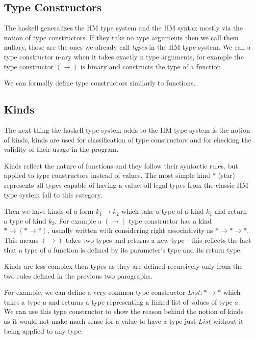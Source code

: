 \subsection{Type Constructors}

The haskell generalizes the HM type system and the HM syntax mostly via the notion of type constructors. If they take no type arguments then we call them nullary, those are the ones we already call \emph{types} in the HM type system. We call a type constructor n-ary when it takes exactly n type arguments, for example the type constructor $(\rightarrow)$ is binary and constructs the type of a function. %

We can formally define type constructors similarly to functions.

\subsection{Kinds}

The next thing the haskell type system adds to the HM type system is the notion of kinds, kinds are used for classification of type constructors and for checking the validity of their usage in the program.

Kinds reflect the nature of functions and they follow their syntactic rules, but applied to type constructors instead of values. The most simple kind $*$ (star) represents all types capable of having a value: all legal types from the classic HM type system fall to this category.

Then we have kinds of a form $k_1 \rightarrow k_2$ which take a type of a kind $k_1$ and return a type of kind $k_2$. For example a $(\rightarrow)$ type constructor has a kind $* \rightarrow (* \rightarrow *)$, usually written with considering right associativity as $* \rightarrow * \rightarrow *$. This means $(\rightarrow)$ takes two types and returns a new type - this reflects the fact that a type of a function is defined by its parameter's type and its return type.

Kinds are less complex then types as they are defined recursively only from the two rules defined in the previous two paragraphs.

For example, we can define a very common type constructor $List: * \rightarrow *$ which takes a type $a$ and returns a type representing a linked list of values of type $a$. We can use this type constructor to show the reason behind the notion of kinds as it would not make much sense for a value to have a type just $List$ without it being applied to any type. %

